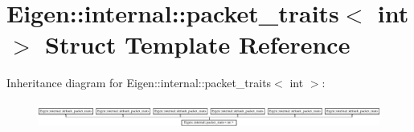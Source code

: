 \hypertarget{struct_eigen_1_1internal_1_1packet__traits_3_01int_01_4}{}\section{Eigen\+:\+:internal\+:\+:packet\+\_\+traits$<$ int $>$ Struct Template Reference}
\label{struct_eigen_1_1internal_1_1packet__traits_3_01int_01_4}
Inheritance diagram for Eigen\+:\+:internal\+:\+:packet\+\_\+traits$<$ int $>$\+:\begin{figure}[H]
\begin{center}
\leavevmode
\includegraphics[height=0.840841cm]{struct_eigen_1_1internal_1_1packet__traits_3_01int_01_4}
\end{center}
\end{figure}
